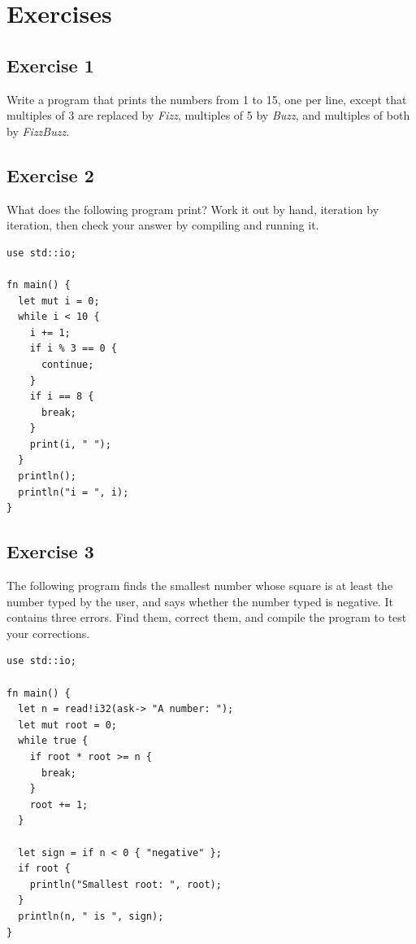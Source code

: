 \vfill%
\pagebreak

\section*{Exercises}
%
\subsection*{Exercise 1}

Write a program that prints the numbers from 1 to 15, one per line, except that
multiples of 3 are replaced by \textit{Fizz}, multiples of 5 by \textit{Buzz},
and multiples of both by \textit{FizzBuzz}.

\subsection*{Exercise 2}

What does the following program print? Work it out by hand, iteration by
iteration, then check your answer by compiling and running it.

\begin{lstlisting}[style=coloredverbatim]
use std::io;

fn main() {
  let mut i = 0;
  while i < 10 {
    i += 1;
    if i % 3 == 0 {
      continue;
    }
    if i == 8 {
      break;
    }
    print(i, " ");
  }
  println();
  println("i = ", i);
}
\end{lstlisting}

\subsection*{Exercise 3}

The following program finds the smallest number whose square is at least the
number typed by the user, and says whether the number typed is negative. It contains
three errors. Find them, correct them, and compile the program to test your
corrections.

\begin{lstlisting}[style=coloredverbatimError, caption=Ymir program with errors]
use std::io;

fn main() {
  let n = read!i32(ask-> "A number: ");
  let mut root = 0;
  while true {
    if root * root >= n {
      break;
    }
    root += 1;
  }

  let sign = if n < 0 { "negative" };
  if root {
    println("Smallest root: ", root);
  }
  println(n, " is ", sign);
}
\end{lstlisting}

